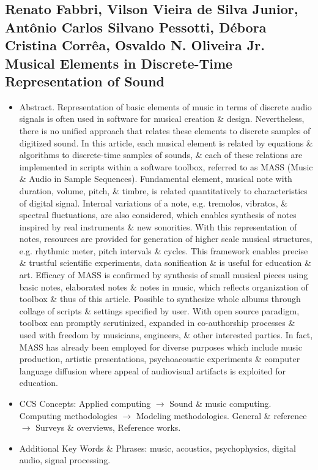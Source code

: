 \documentclass{article}
\begin{document}
\subsection{{\sc Renato Fabbri, Vilson Vieira de Silva Junior, Ant\^onio Carlos Silvano Pessotti, D\'ebora Cristina Corr\^ea, Osvaldo N. Oliveira Jr.} Musical Elements in Discrete-Time Representation of Sound}
{\sf[2 citations]}
\begin{itemize}
	\item {\sf Abstract.} Representation of basic elements of music in terms of discrete audio signals is often used in software for musical creation \& design. Nevertheless, there is no unified approach that relates these elements to discrete samples of digitized sound. In this article, each musical element is related by equations \& algorithms to discrete-time samples of sounds, \& each of these relations are implemented in scripts within a software toolbox, referred to as MASS (Music \& Audio in Sample Sequences). Fundamental element, musical note with duration, volume, pitch, \& timbre, is related quantitatively to characteristics of digital signal. Internal variations of a note, e.g. tremolos, vibratos, \& spectral fluctuations, are also considered, which enables synthesis of notes inspired by real instruments \& new sonorities. With this representation of notes, resources are provided for generation of higher scale musical structures, e.g. rhythmic meter, pitch intervals \& cycles. This framework enables precise \& trustful scientific experiments, data sonification \& is useful for education \& art. Efficacy of MASS is confirmed by synthesis of small musical pieces using basic notes, elaborated notes \& notes in music, which reflects organization of toolbox \& thus of this article. Possible to synthesize whole albums through collage of scripts \& settings specified by user. With open source paradigm, toolbox can promptly scrutinized, expanded in co-authorship processes \& used with freedom by musicians, engineers, \& other interested parties. In fact, MASS has already been employed for diverse purposes which include music production, artistic presentations, psychoacoustic experiments \& computer language diffusion where appeal of audiovisual artifacts is exploited for education.
	\item CCS Concepts: Applied computing $\to$ Sound \& music computing. Computing methodologies $\to$ Modeling methodologies. General \& reference $\to$ Surveys \& overviews, Reference works.
	\item Additional Key Words \& Phrases: music, acoustics, psychophysics, digital audio, signal processing.

\end{itemize}
\end{document}
